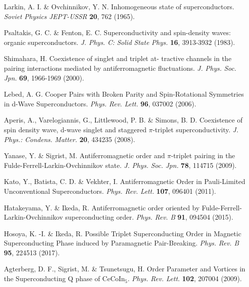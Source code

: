 \documentclass[article,twocolumn,showpacs,preprintnumbers,amsmath,amssymb, superscriptaddress]{revtex4-1}
\begin{document}
\begin{thebibliography}{20}
Larkin, A. I. \& Ovchinnikov, Y. N.
\newblock Inhomogeneous state of superconductors.
\newblock \textit{Soviet Physics JEPT-USSR} \textbf{20}, 762 (1965).

Psaltakis, G. C. \& Fenton, E. C.
\newblock Superconductivity and spin-density waves: organic superconductors.
\newblock \textit{J. Phys. C: Solid State Phys.} \textbf{16}, 3913-3932 (1983).

Shimahara, H.
\newblock Coexistence of singlet and triplet at- tractive channels in the pairing interactions mediated by antiferromagnetic fluctuations.
\newblock \textit{J. Phys. Soc. Jpn.} \textbf{69}, 1966-1969 (2000).

Lebed, A. G.
\newblock Cooper Pairs with Broken Parity and Spin-Rotational Symmetries in d-Wave Superconductors.
\newblock \textit{Phys. Rev. Lett.} \textbf{96}, 037002 (2006).

Aperis, A., Varelogiannis, G., Littlewood, P. B. \& Simons, B. D.
\newblock Coexistence of spin density wave, d-wave singlet and staggered $\pi$-triplet superconductivity.
\newblock \textit{J. Phys.: Condens. Matter.} \textbf{20}, 434235 (2008).

Yanase, Y.  \& Sigrist, M.
\newblock Antiferromagnetic order and $\pi$-triplet pairing in the Fulde-Ferrell-Larkin-Ovchinnikov state.
\newblock \textit{J. Phys. Soc. Jpn.} \textbf{78}, 114715 (2009).
 
Kato, Y., Batista, C. D. \& Vekhter, I.
\newblock Antiferromagnetic Order in Pauli-Limited Unconventional Superconductors.
\newblock \textit{Phys. Rev. Lett.} \textbf{107}, 096401 (2011).

Hatakeyama, Y. \& Ikeda, R.
\newblock Antiferromagnetic order oriented by Fulde-Ferrell-Larkin-Ovchinnikov superconducting order.
\newblock \textit{Phys. Rev. B} \textbf{91}, 094504 (2015).

Hosoya, K. -I. \& Ikeda, R.
\newblock Possible Triplet Superconducting Order in Magnetic Superconducting Phase induced by Paramagnetic Pair-Breaking.
\newblock \textit{Phys. Rev. B} \textbf{95}, 224513 (2017).

Agterberg, D. F., Sigrist, M. \& Tsunetsugu, H.
\newblock Order Parameter and Vortices in the Superconducting Q phase of CeCoIn$_5$.
\newblock \textit{Phys. Rev. Lett.} \textbf{102}, 207004 (2009).


\end{thebibliography}
\end{document}
